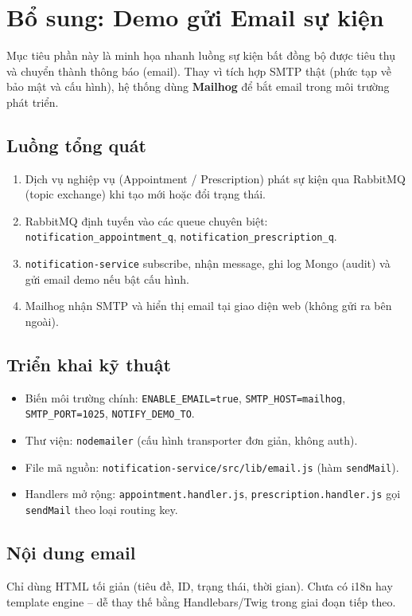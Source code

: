 \documentclass[12pt,a4paper]{report}
\begin{document}
    \section{Bổ sung: Demo gửi Email sự kiện}\label{sec:email-demo}
    Mục tiêu phần này là minh họa nhanh luồng sự kiện bất đồng bộ được tiêu thụ và chuyển thành thông báo (email). Thay vì tích hợp SMTP thật (phức tạp về bảo mật và cấu hình), hệ thống dùng \textbf{Mailhog} để bắt email trong môi trường phát triển.

    \subsection*{Luồng tổng quát}
    \begin{enumerate}
        \item Dịch vụ nghiệp vụ (Appointment / Prescription) phát sự kiện qua RabbitMQ (topic exchange) khi tạo mới hoặc đổi trạng thái.
        \item RabbitMQ định tuyến vào các queue chuyên biệt: \texttt{notification\_appointment\_q}, \texttt{notification\_prescription\_q}.
        \item \texttt{notification-service} subscribe, nhận message, ghi log Mongo (audit) và gửi email demo nếu bật cấu hình.
        \item Mailhog nhận SMTP và hiển thị email tại giao diện web (không gửi ra bên ngoài).
    \end{enumerate}

    \subsection*{Triển khai kỹ thuật}
    \begin{itemize}
        \item Biến môi trường chính: \texttt{ENABLE\_EMAIL=true}, \texttt{SMTP\_HOST=mailhog}, \texttt{SMTP\_PORT=1025}, \texttt{NOTIFY\_DEMO\_TO}.
        \item Thư viện: \texttt{nodemailer} (cấu hình transporter đơn giản, không auth).
        \item File mã nguồn: \texttt{notification-service/src/lib/email.js} (hàm \texttt{sendMail}).
        \item Handlers mở rộng: \texttt{appointment.handler.js}, \texttt{prescription.handler.js} gọi \texttt{sendMail} theo loại routing key.
    \end{itemize}

    \subsection*{Nội dung email}
    Chỉ dùng HTML tối giản (tiêu đề, ID, trạng thái, thời gian). Chưa có i18n hay template engine – dễ thay thế bằng Handlebars/Twig trong giai đoạn tiếp theo.
\end{document}
